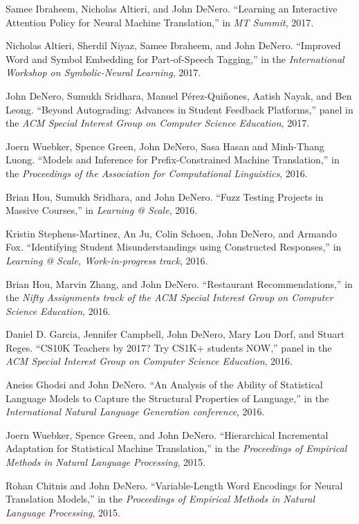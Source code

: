 \documentclass[margin,line]{res}
\begin{document}
\begin{resume}
Samee Ibraheem, Nicholas Altieri, and John DeNero. ``Learning an Interactive Attention Policy for Neural Machine Translation,'' in {\it MT Summit}, 2017.

Nicholas Altieri, Sherdil Niyaz, Samee Ibraheem, and John DeNero. ``Improved Word and Symbol Embedding for Part-of-Speech Tagging,'' in the {\it International Workshop on Symbolic-Neural Learning}, 2017.

John DeNero, Sumukh Sridhara, Manuel P\'erez-Qui\~nones, Aatish Nayak, and Ben Leong. ``Beyond Autograding: Advances in Student Feedback Platforms,'' panel in the {\it ACM Special Interest Group on Computer Science Education}, 2017.

Joern Wuebker, Spence Green, John DeNero, Sasa Hasan and Minh-Thang Luong. ``Models and Inference for Prefix-Constrained Machine Translation,'' in the {\it Proceedings of the Association for Computational Linguistics}, 2016.

Brian Hou, Sumukh Sridhara, and John DeNero. ``Fuzz Testing Projects in Massive Courses,'' in {\it Learning @ Scale}, 2016.

Kristin Stephens-Martinez, An Ju, Colin Schoen, John DeNero, and Armando Fox. ``Identifying Student Misunderstandings using Constructed Responses,'' in {\it Learning @ Scale, Work-in-progress track}, 2016.

Brian Hou, Marvin Zhang, and John DeNero. ``Restaurant Recommendations,'' in the {\it Nifty Assignments track of the ACM Special Interest Group on Computer Science Education}, 2016.

Daniel D. Garcia, Jennifer Campbell, John DeNero, Mary Lou Dorf, and Stuart Reges. ``CS10K Teachers by 2017?  Try CS1K+ students NOW,'' panel in the {\it ACM Special Interest Group on Computer Science Education}, 2016.

Aneiss Ghodsi and John DeNero. ``An Analysis of the Ability of Statistical Language Models to Capture the Structural Properties of Language,'' in the {\it International Natural Language Generation conference}, 2016.

Joern Wuebker, Spence Green, and John DeNero. ``Hierarchical Incremental Adaptation for Statistical Machine Translation,'' in the {\it Proceedings of Empirical Methods in Natural Language Processing}, 2015.

Rohan Chitnis and John DeNero. ``Variable-Length Word Encodings for Neural Translation Models,'' in the {\it Proceedings of Empirical Methods in Natural Language Processing}, 2015.


\end{resume}
\end{document}
